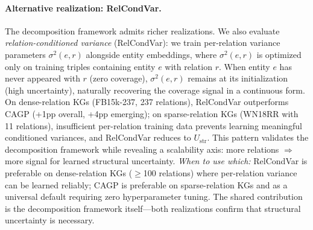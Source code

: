 \paragraph{Alternative realization: RelCondVar.}
\label{sec:relcondvar}
The decomposition framework admits richer realizations. We also evaluate \emph{relation-conditioned variance} (RelCondVar): we train per-relation variance parameters $\sigma^2(e, r)$ alongside entity embeddings, where $\sigma^2(e,r)$ is optimized only on training triples containing entity $e$ with relation $r$. When entity $e$ has never appeared with $r$ (zero coverage), $\sigma^2(e,r)$ remains at its initialization (high uncertainty), naturally recovering the coverage signal in a continuous form. On dense-relation KGs (FB15k-237, 237 relations), RelCondVar outperforms CAGP (+1pp overall, +4pp emerging); on sparse-relation KGs (WN18RR with 11 relations), insufficient per-relation training data prevents learning meaningful conditioned variances, and RelCondVar reduces to $U_{\text{str}}$. This pattern validates the decomposition framework while revealing a scalability axis: more relations $\Rightarrow$ more signal for learned structural uncertainty. \emph{When to use which:} RelCondVar is preferable on dense-relation KGs ($\geq$100 relations) where per-relation variance can be learned reliably; CAGP is preferable on sparse-relation KGs and as a universal default requiring zero hyperparameter tuning. The shared contribution is the decomposition framework itself---both realizations confirm that structural uncertainty is necessary.
